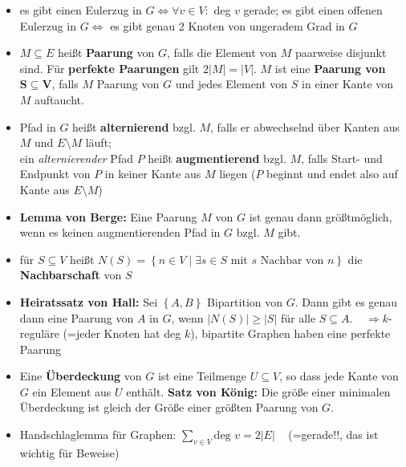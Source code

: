 \documentclass[10pt,a4paper]{article}
\begin{document}
\begin{itemize}
\item es gibt einen Eulerzug in $G\Leftrightarrow \forall v\in V :$ deg $v$ gerade; es gibt einen offenen Eulerzug in $G\Leftrightarrow$ es gibt genau 2 Knoten von ungeradem Grad in $G$
\item $M\subseteq E$ heißt \textbf{Paarung} von $G$, falls die Element von $M$ paarweise disjunkt sind. Für \textbf{perfekte Paarungen} gilt $2\vert M\vert=\vert V\vert$. $M$ ist eine \textbf{Paarung von} $\boldsymbol{S\subseteq V}$, falls $M$ Paarung von $G$ und jedes Element von $S$ in einer Kante von $M$ auftaucht.
\item Pfad in $G$ heißt \textbf{alternierend} bzgl. $M$, falls er abwechselnd über Kanten aus $M$ und $E\setminus M$ läuft;\\ ein \textit{alternierender} Pfad $P$ heißt \textbf{augmentierend} bzgl. $M$, falls Start- und Endpunkt von $P$ in keiner Kante aus $M$ liegen ($P$ beginnt und endet also auf Kante aus $E\setminus M$)
\item \textbf{Lemma von Berge:} Eine Paarung $M$ von $G$ ist genau dann größtmöglich, wenn es keinen augmentierenden Pfad in $G$ bzgl. $M$ gibt.
\item für $S\subseteq V$ heißt $N(S)=\left\lbrace n\in V\mid \exists s\in S  \text{ mit } s \text{ Nachbar von }n\right\rbrace$ die \textbf{Nachbarschaft} von $S$
\item \textbf{Heiratssatz von Hall:} Sei $\left\lbrace A,B \right\rbrace$ Bipartition von $G$. Dann gibt es genau dann eine Paarung von $A$ in $G$, wenn $\vert N(S)\vert\geq \vert S\vert$ für alle $S\subseteq A$.$\;\;\;\; \Rightarrow k$-reguläre (=jeder Knoten hat deg $k$), bipartite Graphen haben eine perfekte Paarung 
\item Eine \textbf{Überdeckung} von $G$ ist eine Teilmenge $U\subseteq V$, so dass jede Kante von $G$ ein Element aus $U$ enthält. \textbf{Satz von König:} Die größe einer minimalen Überdeckung ist gleich der Größe einer größten Paarung von $G$.
\item Handschlaglemma für Graphen: $\sum_{v\in V} \text{deg }v=2\vert E \vert\;\;\;$ (=gerade!!, das ist wichtig für Beweise)
\end{itemize}
\end{document}
